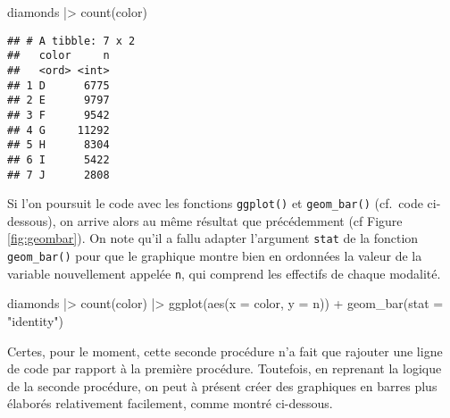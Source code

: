 \documentclass[
]{book}
\newenvironment{Shaded}{\begin{snugshade}}{\end{snugshade}}
\newcommand{\AttributeTok}[1]{\textcolor[rgb]{0.77,0.63,0.00}{#1}}
\newcommand{\FunctionTok}[1]{\textcolor[rgb]{0.00,0.00,0.00}{#1}}
\newcommand{\NormalTok}[1]{#1}
\newcommand{\SpecialCharTok}[1]{\textcolor[rgb]{0.00,0.00,0.00}{#1}}
\newcommand{\StringTok}[1]{\textcolor[rgb]{0.31,0.60,0.02}{#1}}
\begin{document}
\begin{Shaded}
\begin{Highlighting}[]
\NormalTok{diamonds }\SpecialCharTok{|\textgreater{}} 
  \FunctionTok{count}\NormalTok{(color)}
\end{Highlighting}
\end{Shaded}

\begin{verbatim}
## # A tibble: 7 x 2
##   color     n
##   <ord> <int>
## 1 D      6775
## 2 E      9797
## 3 F      9542
## 4 G     11292
## 5 H      8304
## 6 I      5422
## 7 J      2808
\end{verbatim}

Si l'on poursuit le code avec les fonctions \texttt{ggplot()} et \texttt{geom\_bar()} (cf.~code ci-dessous), on arrive alors au même résultat que précédemment (cf Figure \ref{fig:geombar}). On note qu'il a fallu adapter l'argument \texttt{stat} de la fonction \texttt{geom\_bar()} pour que le graphique montre bien en ordonnées la valeur de la variable nouvellement appelée \texttt{n}, qui comprend les effectifs de chaque modalité.

\begin{Shaded}
\begin{Highlighting}[]
\NormalTok{diamonds }\SpecialCharTok{|\textgreater{}} 
  \FunctionTok{count}\NormalTok{(color) }\SpecialCharTok{|\textgreater{}}
  \FunctionTok{ggplot}\NormalTok{(}\FunctionTok{aes}\NormalTok{(}\AttributeTok{x =}\NormalTok{ color, }\AttributeTok{y =}\NormalTok{ n)) }\SpecialCharTok{+}
     \FunctionTok{geom\_bar}\NormalTok{(}\AttributeTok{stat =} \StringTok{"identity"}\NormalTok{)}
\end{Highlighting}
\end{Shaded}

Certes, pour le moment, cette seconde procédure n'a fait que rajouter une ligne de code par rapport à la première procédure. Toutefois, en reprenant la logique de la seconde procédure, on peut à présent créer des graphiques en barres plus élaborés relativement facilement, comme montré ci-dessous.
\end{document}
